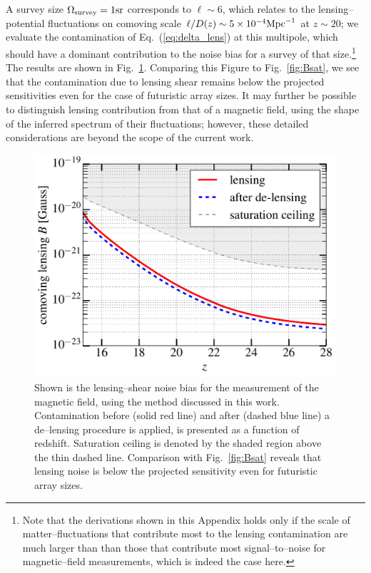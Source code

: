 A survey size $\Omega_{\rm survey}=1{\rm sr}$ corresponds to $\ell\sim 6$, which relates to the lensing--potential fluctuations on comoving scale $\ell/D(z)\sim 5\times 10^{-4}{\rm Mpc}^{-1}$ at $z\sim 20$; we evaluate the contamination of Eq.~(\ref{eq:delta_lens}) at this multipole, which should have a dominant contribution to the noise bias for a survey of that size.\footnote{Note that the derivations shown in this Appendix holds only if the scale of matter--fluctuations that contribute most to the lensing contamination are much larger than than those that contribute most signal--to--noise for magnetic--field measurements, which is indeed the case here.} The results are shown in Fig.~\ref{fig:lensing_B}. Comparing this Figure to Fig.~\ref{fig:Bsat}, we see that the contamination due to lensing shear remains below the projected sensitivities even for the case of futuristic array sizes. It may further be possible to distinguish lensing contribution from that of a magnetic field, using the shape of the inferred spectrum of their fluctuations; however, these detailed considerations are beyond the scope of the current work.
\begin{figure}[h]
\centering
\includegraphics[scale=0.4]{delensingB.pdf}
\caption{Shown is the lensing--shear noise bias for the measurement of the magnetic field, using the method discussed in this work. Contamination before (solid red line) and after (dashed blue line) a de--lensing procedure is applied, is presented as a function of redshift. Saturation ceiling is denoted by the shaded region above the thin dashed line. Comparison with Fig.~\ref{fig:Bsat} reveals that lensing noise is below the projected sensitivity even for futuristic array sizes.}
\label{fig:lensing_B}
\end{figure}
